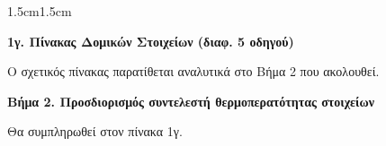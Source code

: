\documentclass[12pt,a4paper]{article}
\begin{document}
\begin{adjustwidth}{1.5cm}{1.5cm}

{\bfseries 1γ. Πίνακας Δομικών Στοιχείων (διαφ. 5 οδηγού)\par}

\vspace{0.2cm}

{\fontsize{12}{14}\selectfont
Ο σχετικός πίνακας παρατίθεται αναλυτικά στο Βήμα 2 που ακολουθεί.\par}

\vspace{0.55cm}

{\color{wordblue}\bfseries\fontsize{13}{15}\selectfont
Βήμα 2. Προσδιορισμός συντελεστή θερμοπερατότητας στοιχείων\par}

\vspace{0.3cm}

{\fontsize{12}{14}\selectfont
Θα συμπληρωθεί στον πίνακα 1γ.\par}

\end{adjustwidth}
\end{document}
